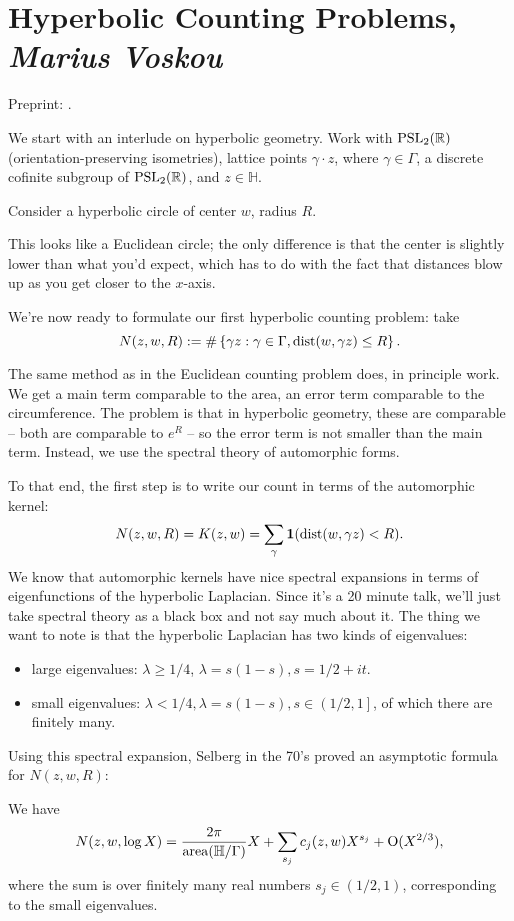 \documentclass[reqno]{amsart} 
\begin{document}
\section{Hyperbolic Counting Problems, \textnormal{\emph{Marius Voskou}}}
Preprint: \cite{2024arXiv2407.03134}.

We start with an interlude on hyperbolic geometry.  Work with $\operatorname{PSL}_2(\mathbb{R})$ (orientation-preserving isometries), lattice points $\gamma \cdot z$, where $\gamma \in \Gamma$, a discrete cofinite subgroup of $\operatorname{PSL}_2(\mathbb{R})$, and $z \in \mathbb{H}$.

Consider a hyperbolic circle of center $w$, radius $R$.

This looks like a Euclidean circle; the only difference is that the center is slightly lower than what you'd expect, which has to do with the fact that distances blow up as you get closer to the $x$-axis.

We're now ready to formulate our first hyperbolic counting problem: take
\begin{equation*}
  N(z, w, R) := \# \left\{ \gamma z : \gamma \in \Gamma, \operatorname{dist}(w, \gamma z) \leq R \right\}.
\end{equation*}

The same method as in the Euclidean counting problem does, in principle work.  We get a main term comparable to the area, an error term comparable to the circumference.  The problem is that in hyperbolic geometry, these are comparable -- both are comparable to $e^R$ -- so the error term is not smaller than the main term.  Instead, we use the spectral theory of automorphic forms.

To that end, the first step is to write our count in terms of the automorphic kernel:
\begin{equation*}
  N(z, w, R) = K(z, w)
  = \sum_{\gamma} \mathbf{1}(\operatorname{dist}(w, \gamma z) < R).
\end{equation*}
We know that automorphic kernels have nice spectral expansions in terms of eigenfunctions of the hyperbolic Laplacian.  Since it's a 20 minute talk, we'll just take spectral theory as a black box and not say much about it.  The thing we want to note is that the hyperbolic Laplacian has two kinds of eigenvalues:
\begin{itemize}
\item large eigenvalues: $\lambda \geq 1/4$, $\lambda = s(1 - s), s = 1/2 + i t$.
\item small eigenvalues: $\lambda < 1/4, \lambda = s(1 - s), s \in \left(1/2,1\right]$, of which there are finitely many.
\end{itemize}
Using this spectral expansion, Selberg in the 70's proved an asymptotic formula for $N(z, w, R)$:
\begin{theorem}
  We have
  \begin{equation*}
    N(z, w, \log X)
    = \frac{2 \pi}{\operatorname{area}(\mathbb{H} / \Gamma)}
    X + \sum_{s_j}
    c_j(z, w) X^{s_j} + \operatorname{O}(X^{2/3}),
  \end{equation*}
  where the sum is over finitely many real numbers $s_j \in(1/2, 1)$, corresponding to the small eigenvalues.
\end{theorem}
\end{document}
